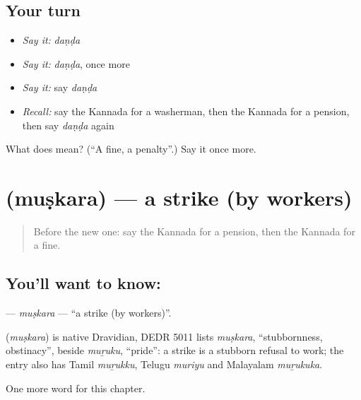 \subsection*{Your turn}
\begin{itemize}
\raggedright
  \item \emph{Say it:} \emph{daṇḍa}
  \item \emph{Say it:} \emph{daṇḍa}, once more
  \item \emph{Say it:} say \emph{daṇḍa}
  \item \emph{Recall:} say the Kannada for a washerman, then the Kannada for a pension, then say \emph{daṇḍa} again
\end{itemize}

\begin{tcolorbox}[breakable,colback=teal!4,colframe=teal!35!black,title={Before you move on}]
What does  mean? (\textquotedblleft{}A fine, a penalty\textquotedblright{}.) Say it once more.
\end{tcolorbox}
\section[\texorpdfstring{\kn{ಮುಷ್ಕರ} (muṣkara)}{ಮುಷ್ಕರ (muṣkara)}]{ (muṣkara) — a strike (by workers)}

\label{lesson:KA-C271-muskara}



\begin{quote}
Before the new one: say the Kannada for a pension, then the Kannada for a fine.
\end{quote}

\subsection*{You'll want to know: }
\textbf{} — \emph{muṣkara} — \textquotedblleft{}a strike (by workers)\textquotedblright{}.

\begin{cousinweb}
\textbf{} (\emph{muṣkara}) is native Dravidian, DEDR 5011 lists \emph{muṣkara}, \textquotedblleft{}stubbornness, obstinacy\textquotedblright{}, beside \emph{muṟuku}, \textquotedblleft{}pride\textquotedblright{}: a strike is a stubborn refusal to work; the entry also has Tamil \emph{muṟukku}, Telugu \emph{muriyu} and Malayalam \emph{muṟukuka}.
\end{cousinweb}

\begin{grammarlens}[title={What you've built}]
One more word for this chapter.
\end{grammarlens}

